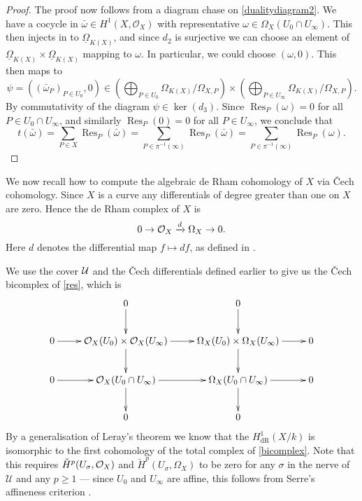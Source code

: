 \documentclass[11pt]{article} %
\theoremstyle{plain}
\theoremstyle{remark}
\newcommand{\cO}{{\cal O}}
\newcommand{\cU}{{\mathcal U}}
\newcommand{\cech}{\v{C}ech }
\newcommand{\hone}{H^1(X,\mathcal{O}_X)}
\newcommand{\derhamhone}{H_{\text {dR}}^1(X/k)}
\DeclareMathOperator{\res}{Res}
\begin{document}
\begin{proof}
The proof now follows from a diagram chase on \eqref{dualitydiagram2}.
 We have a cocycle in $\bar \omega \in \hone$ with representative $\omega \in \Omega_X(U_0 \cap U_\infty)$.
This then injects in to $\underline{\Omega}_{K(X)}$, and since $d_2$ is surjective we can choose an element of $\underline{\Omega}_{K(X)} \times \underline{\Omega}_{K(X)}$ mapping to $\omega$.
In particular, we could choose $(\omega,0)$.
This then maps to 
\[
\psi = ((\bar{\omega}_P)_{P\in U_0}, 0) \in \left( \bigoplus_{P \in U_0} \Omega_{K(X)}/\Omega_{X,P}\right) \times \left( \bigoplus_{P \in U_\infty} \Omega_{K(X)}/\Omega_{X,P} \right).
\]
By commutativity of the diagram $\psi \in \ker(d_3)$.
Since $\res_P(\omega)=0$ for all $P \in U_0 \cap U_\infty$, and similarly $\res_P(0)=0$ for all $P \in U_\infty$, we conclude that 
\[
t(\bar \omega) = \sum_{P \in X}\res_P(\bar \omega) = \sum_{P \in \pi^{-1}(\infty)} \res_P(\bar \omega) = \sum_{P \in \pi^{-1}(\infty)} \res_P(\omega).
\]
\end{proof}

We now recall how to compute the algebraic de Rham cohomology of $X$ via \cech cohomology.
Since $X$ is a curve any differentials of degree greater than one on $X$ are zero.
Hence the de Rham complex of $X$ is 
\begin{equation}\label{res}
0 \rightarrow \cO_X \xrightarrow{d} \Omega_X \rightarrow 0.
\end{equation}
Here $d$ denotes the differential map $f \mapsto df$, as defined in \cite[Chap II, \S 8, Pg. 172]{hart}.

We use the cover $\cal U$ and the \cech differentials defined earlier to give us the \cech bicomplex of \eqref{res}, which is
\begin{equation}\label{bicomplex}
\xymatrix{ & 0 \ar[d] & 0 \ar[d] & \\
0 \ar[r] & \cO_X(U_0) \times \cO_X(U_\infty) \ar[d] \ar[r] & \Omega_X(U_0) \times \Omega_X(U_\infty) \ar[d] \ar[r] & 0 \\
0 \ar[r] & \cO_X(U_0\cap U_\infty) \ar[d] \ar[r] & \Omega_X(U_0 \cap U_\infty) \ar[r] \ar[d] & 0 \\
& 0 & 0 &}
\end{equation}
By a generalisation of Leray's theorem \cite[Cor 12.4.7]{EGA0III} we know that the $\derhamhone$ is isomorphic to the first cohomology of the total complex of \eqref{bicomplex}.
Note that this requires ${\check H}^p(U_\sigma, \cO_X)$ and ${\check H}^p(U_\sigma, \Omega_X)$ to be zero for any $\sigma$ in the nerve of $\cU$ and any $p \geq 1$ ---
since $U_0$ and $U_\infty$ are affine, this follows from Serre's affineness criterion \cite[Thm 5.2.23]{liu}.
\end{document}

